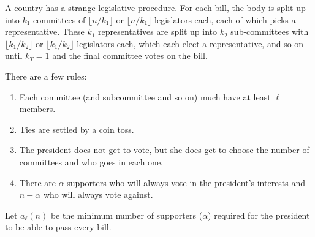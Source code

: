 \documentclass{article}
\begin{document}
A country has a strange legislative procedure.
For each bill, the body is split up into $k_1$ committees of
$\lfloor n/k_1 \rfloor$ or $\lfloor n/k_1 \rfloor$ legislators each,
each of which picks a representative. These $k_1$ representatives are split up
into $k_2$ sub-committees with
$\lfloor k_1/k_2 \rfloor$ or $\lfloor k_1/k_2 \rfloor$ legislators each, which
each elect a representative, and so on until $k_T=1$ and the final committee
votes on the bill.

There are a few rules: \begin{enumerate}
  \item Each committee (and subcommittee and so on) much have at least $\ell$
    members.
  \item Ties are settled by a coin toss.
  \item The president does not get to vote, but she does get to choose the
    number of committees and who goes in each one.
  \item There are $\alpha$ supporters who will always vote in the
  president's interests and $n-\alpha$ who will always vote against.
\end{enumerate}
Let $a_\ell(n)$ be the minimum number of supporters ($\alpha$) required for
the president to be able to pass every bill.
\end{document}
